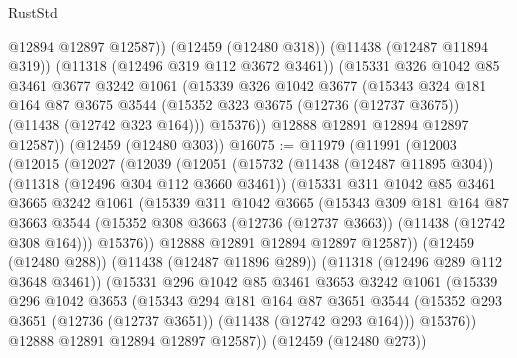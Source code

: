 \begin{lexlean}{RustStd}
\begin{coremodule}
          @12894
          @12897
          @12587))
      (@12459 (@12480 @318))
      (@11438 (@12487 @11894 @319))
      (@11318 (@12496 @319 @112 @3672 @3461))
      (@15331
        @326
        @1042
        @85
        @3461
        @3677
        @3242
        @1061
        (@15339
          @326
          @1042
          @3677
          (@15343
            @324
            @181
            @164
            @87
            @3675
            @3544
            (@15352 @323 @3675 (@12736 (@12737 @3675)) (@11438 (@12742 @323 @164)))
            @15376))
        @12888
        @12891
        @12894
        @12897
        @12587))
    (@12459 (@12480 @303))
@16075 := @11979
    (@11991
      (@12003
        (@12015
          (@12027
            (@12039
              (@12051
                (@15732
                  (@11438 (@12487 @11895 @304))
                  (@11318 (@12496 @304 @112 @3660 @3461))
                  (@15331
                    @311
                    @1042
                    @85
                    @3461
                    @3665
                    @3242
                    @1061
                    (@15339
                      @311
                      @1042
                      @3665
                      (@15343
                        @309
                        @181
                        @164
                        @87
                        @3663
                        @3544
                        (@15352 @308 @3663 (@12736 (@12737 @3663)) (@11438 (@12742 @308 @164)))
                        @15376))
                    @12888
                    @12891
                    @12894
                    @12897
                    @12587))
                (@12459 (@12480 @288))
                (@11438 (@12487 @11896 @289))
                (@11318 (@12496 @289 @112 @3648 @3461))
                (@15331
                  @296
                  @1042
                  @85
                  @3461
                  @3653
                  @3242
                  @1061
                  (@15339
                    @296
                    @1042
                    @3653
                    (@15343
                      @294
                      @181
                      @164
                      @87
                      @3651
                      @3544
                      (@15352 @293 @3651 (@12736 (@12737 @3651)) (@11438 (@12742 @293 @164)))
                      @15376))
                  @12888
                  @12891
                  @12894
                  @12897
                  @12587))
              (@12459 (@12480 @273))

\end{coremodule}
\end{lexlean}
